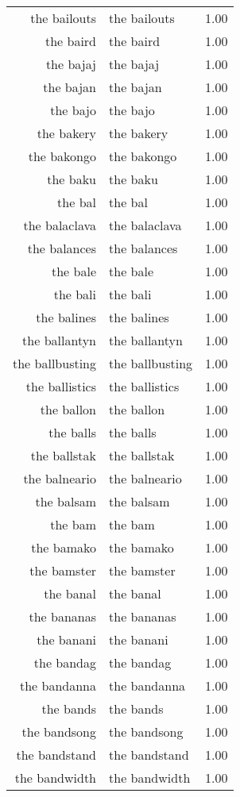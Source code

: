 \begin{table}[ht]
\begin{tabular}{rlr}
  the bailouts & the bailouts & 1.00 \\ 
  the baird & the baird & 1.00 \\ 
  the bajaj & the bajaj & 1.00 \\ 
  the bajan & the bajan & 1.00 \\ 
  the bajo & the bajo & 1.00 \\ 
  the bakery & the bakery & 1.00 \\ 
  the bakongo & the bakongo & 1.00 \\ 
  the baku & the baku & 1.00 \\ 
  the bal & the bal & 1.00 \\ 
  the balaclava & the balaclava & 1.00 \\ 
  the balances & the balances & 1.00 \\ 
  the bale & the bale & 1.00 \\ 
  the bali & the bali & 1.00 \\ 
  the balines & the balines & 1.00 \\ 
  the ballantyn & the ballantyn & 1.00 \\ 
  the ballbusting & the ballbusting & 1.00 \\ 
  the ballistics & the ballistics & 1.00 \\ 
  the ballon & the ballon & 1.00 \\ 
  the balls & the balls & 1.00 \\ 
  the ballstak & the ballstak & 1.00 \\ 
  the balneario & the balneario & 1.00 \\ 
  the balsam & the balsam & 1.00 \\ 
  the bam & the bam & 1.00 \\ 
  the bamako & the bamako & 1.00 \\ 
  the bamster & the bamster & 1.00 \\ 
  the banal & the banal & 1.00 \\ 
  the bananas & the bananas & 1.00 \\ 
  the banani & the banani & 1.00 \\ 
  the bandag & the bandag & 1.00 \\ 
  the bandanna & the bandanna & 1.00 \\ 
  the bands & the bands & 1.00 \\ 
  the bandsong & the bandsong & 1.00 \\ 
  the bandstand & the bandstand & 1.00 \\ 
  the bandwidth & the bandwidth & 1.00 \\ 

\end{tabular}
\end{table}
